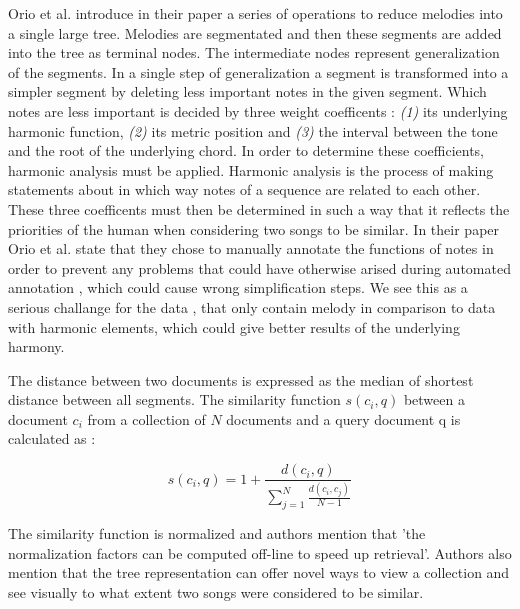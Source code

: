 \documentclass{llncs}
\begin{document}
		Orio et al. \cite{two_point_four} introduce in their paper a series of operations to reduce melodies into a single large tree. Melodies are segmentated and then these segments are added into the tree as terminal nodes. The intermediate nodes represent generalization of the segments. 
		In a single step of generalization a segment is transformed into a simpler segment by deleting less important notes in the given segment. Which notes are less important is decided by three weight coefficents : \textit{(1)} its underlying harmonic function, \textit{(2)} its metric position  and \textit{(3)} the interval between the tone and the root of the underlying chord. 
		In order to determine these coefficients, harmonic analysis must be applied. Harmonic analysis is the process of making statements about in which way notes of a sequence are related to each other. These three coefficents must then be determined in such a way that it reflects the priorities of the human when considering two songs to be similar. 
		In their paper Orio et al. state that they chose to manually annotate the functions of notes in order to prevent any problems that could have otherwise arised during automated annotation , which could cause wrong simplification steps. We see this as a serious challange for the data , that only contain melody in comparison to data with harmonic elements, which could give better results of the underlying harmony. 

		The distance between two documents is expressed as the median of shortest distance between all segments. The similarity function $s(c_i , q)$ between a document $c_i$ from a collection of $N$ documents and a query document q is calculated as :
		
		\begin{equation}
			s(c_i , q)= 1 + \frac{d(c_i , q)}{\sum_{j=1}^{N} \frac{d(c_i,c_j)}{N-1}} 
		\end{equation}

		The similarity function is normalized and authors mention that 'the normalization factors can be computed off-line to speed up retrieval'. Authors also mention that the tree representation can offer novel ways to view a collection and see visually to what extent two songs were considered to be similar.
\end{document}

